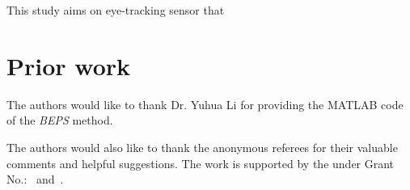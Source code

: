 This study aims on eye-tracking sensor that 

\section{Prior work}



\begin{acks}
  The authors would like to thank Dr. Yuhua Li for providing the
  MATLAB code of the \textit{BEPS} method.

  The authors would also like to thank the anonymous referees for
  their valuable comments and helpful suggestions. The work is
  supported by the  under Grant
  No.:~
  and~.

\end{acks}
